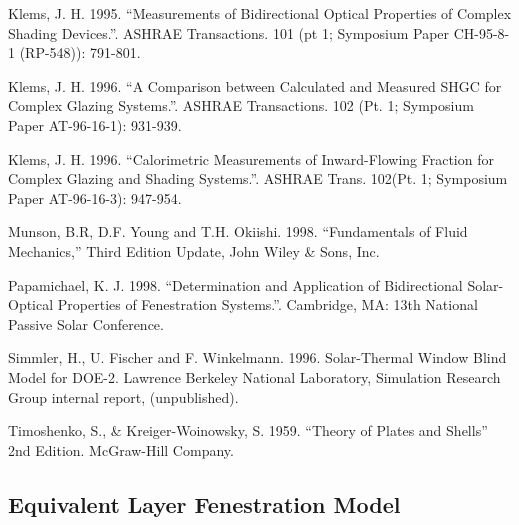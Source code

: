 Klems, J. H. 1995. ``Measurements of Bidirectional Optical Properties of Complex Shading Devices.''. ASHRAE Transactions. 101 (pt 1; Symposium Paper CH-95-8-1 (RP-548)): 791-801.

Klems, J. H. 1996. ``A Comparison between Calculated and Measured SHGC for Complex Glazing Systems.''. ASHRAE Transactions. 102 (Pt. 1; Symposium Paper AT-96-16-1): 931-939.

Klems, J. H. 1996. ``Calorimetric Measurements of Inward-Flowing Fraction for Complex Glazing and Shading Systems.''. ASHRAE Trans. 102(Pt. 1; Symposium Paper AT-96-16-3): 947-954.

Munson, B.R, D.F. Young and T.H. Okiishi. 1998. ``Fundamentals of Fluid Mechanics,'' Third Edition Update, John Wiley \& Sons, Inc.

Papamichael, K. J. 1998. ``Determination and Application of Bidirectional Solar-Optical Properties of Fenestration Systems.''. Cambridge, MA: 13th National Passive Solar Conference.

Simmler, H., U. Fischer and F. Winkelmann. 1996. Solar-Thermal Window Blind Model for DOE-2. Lawrence Berkeley National Laboratory, Simulation Research Group internal report, (unpublished).

Timoshenko, S., \& Kreiger-Woinowsky, S. 1959. ``Theory of Plates and Shells'' 2nd Edition. McGraw-Hill Company.

\subsection{Equivalent Layer Fenestration Model}\label{equivalent-layer-fenestration-model}


